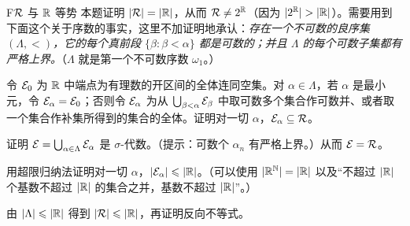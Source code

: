 
\begin{probleme}{F}{$\mathcal{R}$ 与 $\mathbb{R}$ 等势}
本题证明 $\lvert \mathcal{R}\rvert=\lvert \mathbb{R}\rvert$，从而 $\mathcal{R}\neq2^{\mathbb{R}}$（因为 $\lvert 2^{\mathbb{R}}\rvert>\lvert \mathbb{R}\rvert$）。需要用到下面这个关于序数的事实，这里不加证明地承认：\emph{存在一个不可数的良序集 $(\Lambda,<)$，它的每个真前段 $\{\beta:\beta<\alpha\}$ 都是可数的；并且 $\Lambda$ 的每个可数子集都有严格上界。}（$\Lambda$ 就是第一个不可数序数 $\omega_1$。）
\begin{questions}
\item 令 $\mathcal{E}_0$ 为 $\mathbb{R}$ 中端点为有理数的开区间的全体连同空集。对 $\alpha\in\Lambda$，若 $\alpha$ 是最小元，令 $\mathcal{E}_\alpha=\mathcal{E}_0$；否则令 $\mathcal{E}_\alpha$ 为从 $\bigcup_{\beta<\alpha}\mathcal{E}_\beta$ 中取可数多个集合作可数并、或者取一个集合作补集所得到的集合的全体。证明对一切 $\alpha$，$\mathcal{E}_\alpha\subseteq\mathcal{R}$。
\item 证明 $\mathcal{E}=\bigcup_{\alpha\in\Lambda}\mathcal{E}_\alpha$ 是 $\sigma$-代数。（提示：可数个 $\alpha_n$ 有严格上界。）从而 $\mathcal{E}=\mathcal{R}$。
\item 用超限归纳法证明对一切 $\alpha$，$\lvert \mathcal{E}_\alpha\rvert\leqslant\lvert \mathbb{R}\rvert$。（可以使用 $\lvert \mathbb{R}^{\mathbb{N}}\rvert=\lvert \mathbb{R}\rvert$ 以及“不超过 $\lvert \mathbb{R}\rvert$ 个基数不超过 $\lvert \mathbb{R}\rvert$ 的集合之并，基数不超过 $\lvert \mathbb{R}\rvert$”。）
\item 由 $\lvert \Lambda\rvert\leqslant\lvert \mathbb{R}\rvert$ 得到 $\lvert \mathcal{R}\rvert\leqslant\lvert \mathbb{R}\rvert$，再证明反向不等式。
\end{questions}
\end{probleme}
